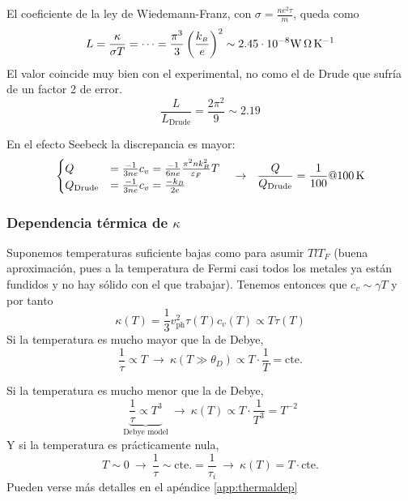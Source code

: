 El coeficiente de la ley de Wiedemann-Franz, con $\sigma = \frac{n e^{2} \tau}{m}$,
queda como
\begin{equation}
  L = \frac{\kappa}{\sigma T} = \cdots = \frac{\pi^3}{3} \left(
    \frac{k_{\scriptscriptstyle{B}} }{e} \right)^2 \sim 2.45 \cdot 10^{-8} \si{\watt\ohm\per\kelvin}
\end{equation}
El valor coincide muy bien con el experimental, no como el de Drude
que sufría de un factor 2 de error.
\begin{equation}
  \frac{L}{L_\text{Drude}} = \frac{2\pi^2}{9} \sim 2.19
\end{equation}

En el efecto Seebeck la discrepancia es mayor:
\begin{equation}
  \begin{cases}
    Q &= \frac{-1}{3ne} c_v = \frac{-1}{6ne} \frac{\pi^2 n
      k_{\scriptscriptstyle{B}} ^2}{\varepsilon_F} T\\
    Q_\text{Drude} &= \frac{-1}{3ne} c_v = \frac{-k_{\scriptscriptstyle{B}} }{2e}
  \end{cases} \ \ \ \rightarrow \ \ \frac{Q}{Q_\text{Drude}} =
  \frac{1}{100} \text{@} \SI{100}{\kelvin}
\end{equation}

\subsubsection{Dependencia térmica de $\kappa$}
Suponemos temperaturas suficiente bajas como para asumir $TlT_F$
(buena aproximación, pues a la temperatura de Fermi casi todos los
metales ya están fundidos y no hay sólido con el que
trabajar). Tenemos entonces que $c_v \sim \gamma T$ y por tanto
\begin{equation}
  \kappa(T) = \frac{1}{3} v_\text{ph}^2  \tau(T)c_v(T) \propto T \tau(T)
\end{equation}
Si la temperatura es mucho mayor que la de Debye,
\begin{equation}
  \frac{1}{\tau} \propto T \ \rightarrow \ \kappa(T \gg \theta_D) \propto T\cdot
  \frac{1}{T} = \text{cte.}
\end{equation}

Si la temperatura es mucho menor que la de Debye,
\begin{equation}
  \label{eq:t3}
  \underbrace{\frac{1}{\tau}\propto T^3}_{\text{Debye model}} \ \rightarrow
  \ \kappa(T) \propto T \cdot \frac{1}{T^3} = T^{-2}
\end{equation}
Y si la temperatura es prácticamente nula,
\begin{equation}
  T \sim 0 \ \rightarrow \  \frac{1}{\tau} \sim \text{cte.} =
  \frac{1}{\tau_i} \ \rightarrow \ \kappa(T) = T\cdot \text{cte.}
\end{equation}
Pueden verse más detalles en el apéndice \ref{app:thermaldep}
